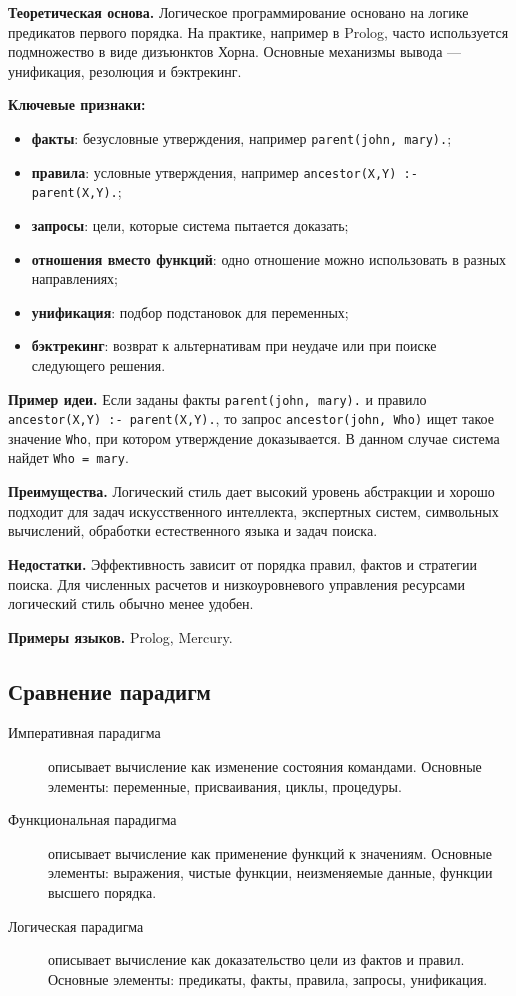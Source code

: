 \textbf{Теоретическая основа.} Логическое программирование основано на логике предикатов первого порядка. На практике, например в Prolog, часто используется подмножество в виде дизъюнктов Хорна. Основные механизмы вывода --- унификация, резолюция и бэктрекинг.

\textbf{Ключевые признаки:}
\begin{itemize}
    \item \textbf{факты}: безусловные утверждения, например \texttt{parent(john, mary).};
    \item \textbf{правила}: условные утверждения, например \texttt{ancestor(X,Y) :- parent(X,Y).};
    \item \textbf{запросы}: цели, которые система пытается доказать;
    \item \textbf{отношения вместо функций}: одно отношение можно использовать в разных направлениях;
    \item \textbf{унификация}: подбор подстановок для переменных;
    \item \textbf{бэктрекинг}: возврат к альтернативам при неудаче или при поиске следующего решения.
\end{itemize}

\textbf{Пример идеи.} Если заданы факты \texttt{parent(john, mary).} и правило \texttt{ancestor(X,Y) :- parent(X,Y).}, то запрос \texttt{ancestor(john, Who)} ищет такое значение \texttt{Who}, при котором утверждение доказывается. В данном случае система найдет \texttt{Who = mary}.

\textbf{Преимущества.} Логический стиль дает высокий уровень абстракции и хорошо подходит для задач искусственного интеллекта, экспертных систем, символьных вычислений, обработки естественного языка и задач поиска.

\textbf{Недостатки.} Эффективность зависит от порядка правил, фактов и стратегии поиска. Для численных расчетов и низкоуровневого управления ресурсами логический стиль обычно менее удобен.

\textbf{Примеры языков.} Prolog, Mercury.

\subsection*{Сравнение парадигм}

\begin{description}
    \item[Императивная парадигма] описывает вычисление как изменение состояния командами. Основные элементы: переменные, присваивания, циклы, процедуры.
    \item[Функциональная парадигма] описывает вычисление как применение функций к значениям. Основные элементы: выражения, чистые функции, неизменяемые данные, функции высшего порядка.
    \item[Логическая парадигма] описывает вычисление как доказательство цели из фактов и правил. Основные элементы: предикаты, факты, правила, запросы, унификация.
\end{description}

